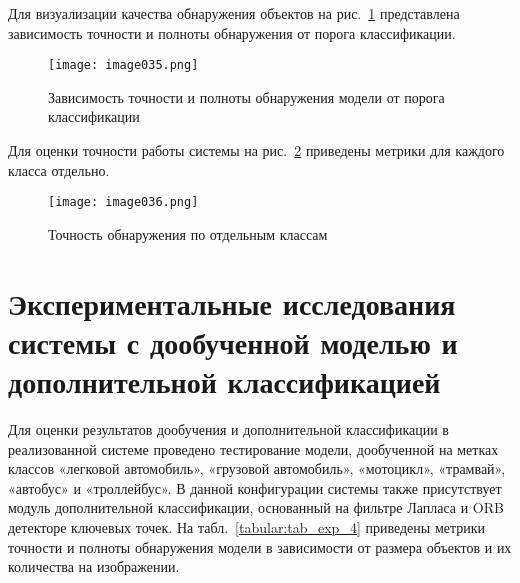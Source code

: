 Для визуализации качества обнаружения объектов на рис.~\ref{fig:image035} представлена зависимость точности и полноты обнаружения от порога классификации.

\begin{figure}[htbp]
\centering
\texttt{[image: image035.png]}
\caption{Зависимость точности и полноты обнаружения модели от порога классификации}%
\label{fig:image035}
\end{figure}

Для оценки точности работы системы на рис.~\ref{fig:image036} приведены метрики для каждого класса отдельно.

\begin{figure}[htbp]
\centering
\texttt{[image: image036.png]}
\caption{Точность обнаружения по отдельным классам}%
\label{fig:image036}
\end{figure}

\section{Экспериментальные исследования системы с дообученной моделью и дополнительной классификацией}

Для оценки результатов дообучения и дополнительной классификации в реализованной системе проведено тестирование модели, дообученной на метках классов «легковой автомобиль», «грузовой автомобиль», «мотоцикл», «трамвай», «автобус» и «троллейбус». В данной конфигурации системы также присутствует модуль дополнительной классификации, основанный на фильтре Лапласа и ORB детекторе ключевых точек. На табл.~\ref{tabular:tab_exp_4} приведены метрики точности и полноты обнаружения модели в зависимости от размера объектов и их количества на изображении.

